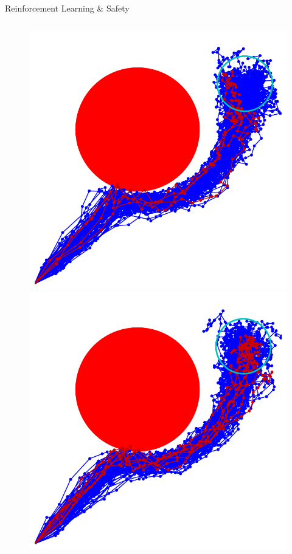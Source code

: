 \documentclass[lecture]{beamer}
\begin{document}
\begin{frame}{\normalsize Reinforcement Learning \& Safety}
\begin{columns}
\begin{overlayarea}{\textwidth}{.55\textheight}
\begin{figure}
{	}
	      \only<17>
        {
        \center
	\includegraphics[width=1\textwidth,clip]{Codes/RL/RLSafety14.pdf}
	}
	      \only<18>
        {
        \center
	\includegraphics[width=1\textwidth,clip]{Codes/RL/RLSafety15.pdf}
}
\end{figure}
\end{overlayarea}
\end{columns}
\end{frame}
\end{document}
